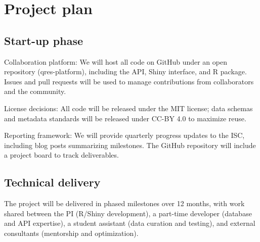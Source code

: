 \documentclass[
]{article}
\begin{document}
\section{Project plan}\label{project-plan}

\subsection{Start-up phase}\label{start-up-phase}

Collaboration platform: We will host all code on GitHub under an open
repository (qres-platform), including the API, Shiny interface, and R
package. Issues and pull requests will be used to manage contributions
from collaborators and the community.

License decisions: All code will be released under the MIT license; data
schemas and metadata standards will be released under CC-BY 4.0 to
maximize reuse.

Reporting framework: We will provide quarterly progress updates to the
ISC, including blog posts summarizing milestones. The GitHub repository
will include a project board to track deliverables.

\subsection{Technical delivery}\label{technical-delivery}

The project will be delivered in phased milestones over 12 months, with
work shared between the PI (R/Shiny development), a part-time developer
(database and API expertise), a student assistant (data curation and
testing), and external consultants (mentorship and optimization).
\end{document}
